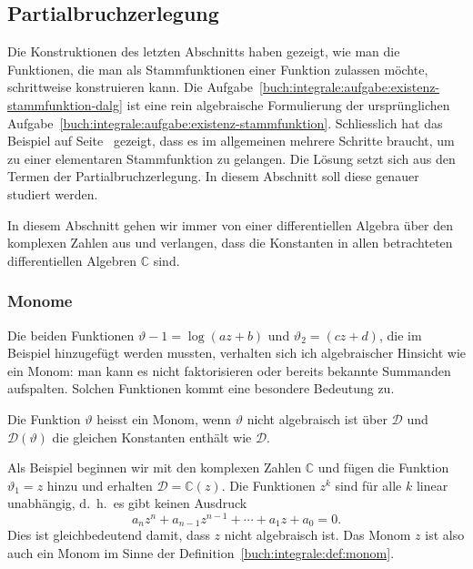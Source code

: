 \subsection{Partialbruchzerlegung
\label{buch:integrale:section:partialbruchzerlegung}}
Die Konstruktionen des letzten Abschnitts haben gezeigt,
wie man die Funktionen, die man als Stammfunktionen einer Funktion
zulassen möchte, schrittweise konstruieren kann.
Die Aufgabe~\ref{buch:integrale:aufgabe:existenz-stammfunktion-dalg}
ist eine rein algebraische Formulierung der ursprünglichen
Aufgabe~\ref{buch:integrale:aufgabe:existenz-stammfunktion}.
Schliesslich hat das Beispiel auf
Seite~\pageref{buch:integrale:beispiel:nichteinfacheelementarefunktion}
gezeigt, dass es im allgemeinen mehrere Schritte braucht, um zu einer
elementaren Stammfunktion zu gelangen.
Die Lösung setzt sich aus den Termen der Partialbruchzerlegung.
In diesem Abschnitt soll diese genauer studiert werden.

In diesem Abschnitt gehen wir immer von einer differentiellen
Algebra über den komplexen Zahlen aus und verlangen, dass die
Konstanten in allen betrachteten differentiellen Algebren
$\mathbb{C}$ sind.

\subsubsection{Monome}
Die beiden Funktionen $\vartheta-1=\log(az+b)$ und $\vartheta_2=(cz+d)$,
die im Beispiel hinzugefügt werden mussten, verhalten sich ich algebraischer
Hinsicht wie ein Monom: man kann es nicht faktorisieren oder bereits
bekannte Summanden aufspalten.
Solchen Funktionen kommt eine besondere Bedeutung zu.

\begin{definition}
\label{buch:integrale:def:monom}
Die Funktion $\vartheta$ heisst ein Monom, wenn $\vartheta$ nicht
algebraisch ist über $\mathscr{D}$ und $\mathscr{D}(\vartheta)$ die
gleichen Konstanten enthält wie $\mathscr{D}$.
\end{definition}

\begin{beispiel}
Als Beispiel beginnen wir mit den komplexen Zahlen $\mathbb{C}$
und fügen die Funktion $\vartheta_1=z$ hinzu und erhalten
$\mathscr{D}=\mathbb{C}(z)$.
Die Funktionen $z^k$ sind für alle $k$ linear unabhängig, d.~h.~es
gibt keinen Ausdruck
\[
a_nz^n + a_{n-1}z^{n-1}+\cdots+a_1z+a_0=0.
\]
Dies ist gleichbedeutend damit, dass $z$ nicht algebraisch ist.
Das Monom $z$ ist also auch ein Monom im Sinne der
Definition~\ref{buch:integrale:def:monom}.
\end{beispiel}

